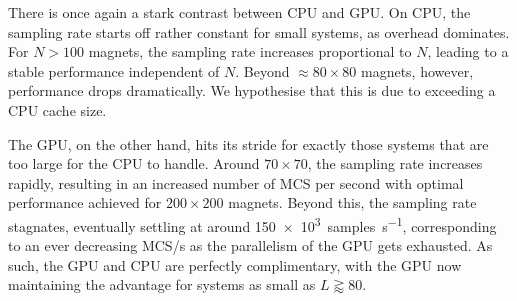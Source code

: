 There is once again a stark contrast between CPU and GPU.
On CPU, the sampling rate starts off rather constant for small systems, as overhead dominates.
For $N>100$ magnets, the sampling rate increases proportional to $N$, leading to a stable performance independent of $N$.
Beyond $\approx 80 \times 80$ magnets, however, performance drops dramatically. %
We hypothesise that this is due to exceeding a CPU cache size. \par
The GPU, on the other hand, hits its stride for exactly those systems that are too large for the CPU to handle.
Around $70 \times 70$, the sampling rate increases rapidly, resulting in an increased number of MCS per second with optimal performance achieved for $200 \times 200$ magnets.
Beyond this, the sampling rate stagnates, eventually settling at around \SI{150e3}{samples\per\second}, corresponding to an ever decreasing MCS/s as the parallelism of the GPU gets exhausted.
As such, the GPU and CPU are perfectly complimentary, with the GPU now maintaining the advantage for systems as small as $L \gtrapprox 80$.

